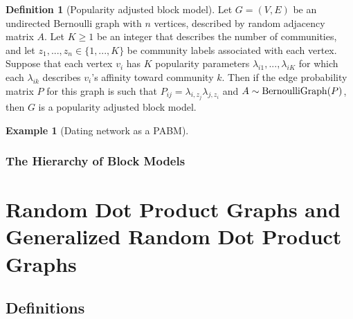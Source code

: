 \documentclass[
  11pt,
]{article}
\theoremstyle{definition}
\newtheorem{definition}{Definition}[section]
\theoremstyle{definition}
\newtheorem{example}{Example}[section]
\theoremstyle{definition}
\theoremstyle{definition}
\theoremstyle{remark}
\begin{document}
\begin{definition}[Popularity adjusted block model]
\label{def:pabm}
Let $G = (V, E)$ be an undirected Bernoulli graph with $n$ vertices, described by random adjacency matrix $A$. 
Let $K \geq 1$ be an integer that describes the number of communities, and let 
$z_1, ..., z_n \in \{1, ..., K\}$ be community labels associated with each vertex. 
Suppose that each vertex $v_i$ has $K$ popularity parameters $\lambda_{i1}, ..., \lambda_{iK}$ for which each $\lambda_{ik}$ describes $v_i$'s affinity toward community $k$. 
Then if the edge probability matrix $P$ for this graph is such that $P_{ij} = \lambda_{i, z_j} \lambda_{j, z_i}$ and $A \sim \mathrm{BernoulliGraph}(P)$, then $G$ is a popularity adjusted block model.
\end{definition}

\begin{example}[Dating network as a PABM]
\label{ex:pabm-dating}
\end{example}

\hypertarget{the-hierarchy-of-block-models}{%
\subsubsection{The Hierarchy of Block Models}\label{the-hierarchy-of-block-models}}

\newpage

\hypertarget{sec:grdpg}{%
\section{Random Dot Product Graphs and Generalized Random Dot Product Graphs}\label{sec:grdpg}}

\hypertarget{definitions}{%
\subsection{Definitions}\label{definitions}}
\end{document}
